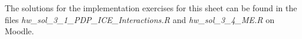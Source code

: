 \documentclass[a4paper]{article}
\begin{document}

The solutions for the implementation exercises for this sheet can be found in the files \textit{hw\_sol\_3\_1\_PDP\_ICE\_Interactions.R} and \textit{hw\_sol\_3\_4\_ME.R} on Moodle.



\dlz



% 



% 
\end{document}
